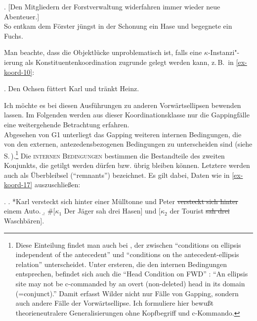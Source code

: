 \ex. \label{ex-koord-9}[Den Mitgliedern der Forstverwaltung widerfahren immer wieder neue Abenteuer.] \\
So entkam dem Förster jüngst in der Schonung ein Hase und begegnete ein Fuchs. \hfill
\cite[(44)]{Fortmann:05}

Man beachte, dass die Objektlücke unproblematisch ist, falls eine $\kappa$-Instanzi"-ierung als Konstituentenkoordination zugrunde gelegt werden kann, z.\,B.\  in \ref{ex-koord-10}:

\ex. \label{ex-koord-10}Den Ochsen füttert Karl und tränkt Heinz. \hfill \cite[(29a)]{Hoehle:83b} 

Ich möchte es bei diesen Ausführungen zu anderen Vorwärtsellipsen bewenden lassen. Im Folgenden werden aus dieser Koordinationsklasse nur die Gappingfälle eine weitergehende Betrachtung erfahren. \\

Abgesehen von G1 unterliegt das Gapping weiteren internen Bedingungen, die von den externen, antezedensbezogenen Bedingungen zu unterscheiden sind (siehe S.\,\pageref{sec-ext-bedingungen}).\footnote{Diese Einteilung findet man auch bei \citet[(40)]{Wilder:97}, der zwischen "`conditions on ellipsis independent of the antecedent"' und "`conditions on the antecedent-ellipsis relation"' unterscheidet. Unter ersteren, die den internen Bedingungen entsprechen, befindet sich auch die "`Head Condition on FWD"' \cite[(54)]{Wilder:97}: "`An ellipsis site may not be c-commanded by an overt (non-deleted) head in its domain (=conjunct)."' Damit erfasst Wilder nicht nur Fälle von Gapping, sondern auch andere Fälle der Vorwärtsellipse. Ich formuliere hier bewu\ss t theorieneutralere Generalisierungen ohne Kopfbegriff und c-Kommando.} Die \textsc{internen Bedingungen} bestimmen die Bestandteile des zweiten Konjunkts, die getilgt werden dürfen bzw. übrig bleiben können. Letztere werden auch als Überbleibsel ("`remnants"') bezeichnet. Es gilt dabei, Daten wie in \ref{ex-koord-17} auszuschlie\ss en:   

\ex. \label{ex-koord-17}
\a. *Karl versteckt sich hinter einer Mülltonne und Peter \sout{versteckt sich hinter} einem Auto. \hfill \cite[148]{Hartmann:00}\label{ex-koord-17-a}
\b. \#[$\kappa_1$ Der Jäger sah drei Hasen] und [$\kappa_2$ der Tourist \sout{sah drei} Waschbären].\label{ex-koord-17-b}

